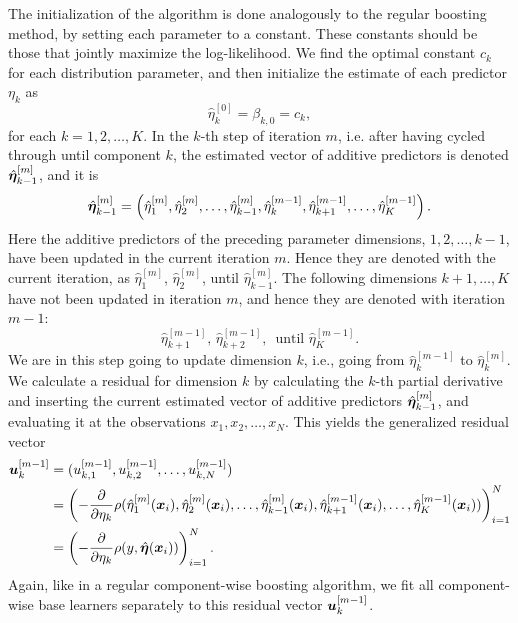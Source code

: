 The initialization of the algorithm is done analogously to the regular boosting method, by setting each parameter to a constant.
These constants should be those that jointly maximize the log-likelihood.
We find the optimal constant $c_k$ for each distribution parameter, and then initialize the estimate of each predictor $\eta_k$ as
\begin{equation*}
    \hat{\eta}_k^{[0]}=\beta_{k,0}=c_k,
\end{equation*}
for each $k=1,2,\ldots,K$.
In the $k$-th step of iteration $m$, i.e. after having cycled through until component $k$, the estimated vector of additive predictors is denoted $\hat{\boldsymbol{\eta}}_{k-1}^{[m]}$, and it is
\begin{equation*}
    \hat{\boldsymbol{\eta}}_{k-1}^{[m]}=\left(\hat{\eta}_1^{[m]},\hat{\eta}_2^{[m]},\ldots,\hat{\eta}_{k-1}^{[m]},\hat{\eta}_{k}^{[m-1]},\hat{\eta}_{k+1}^{[m-1]},\ldots,\hat{\eta}_{K}^{[m-1]}\right).
\end{equation*}
Here the additive predictors of the preceding parameter dimensions, $1,2,\ldots,k-1$, have been updated in the current iteration $m$.
Hence they are denoted with the current iteration, as $\hat{\eta}_1^{[m]}$, $\hat{\eta}_2^{[m]}$, until $\hat{\eta}_{k-1}^{[m]}$.
The following dimensions $k+1,\ldots,K$ have not been updated in iteration $m$, and hence they are denoted with iteration $m-1$:
\begin{equation*}
    \hat{\eta}_{k+1}^{[m-1]},\, \hat{\eta}_{k+2}^{[m-1]},\,\text{ until }\hat{\eta}_{K}^{[m-1]}.
\end{equation*}
We are in this step going to update dimension $k$, i.e., going from $\hat{\eta}_{k}^{[m-1]}$ to $\hat{\eta}_{k}^{[m]}$.
We calculate a residual for dimension $k$ by calculating the $k$-th partial derivative and inserting the current estimated vector of additive predictors $\hat{\boldsymbol{\eta}}_{k-1}^{[m]}$, and evaluating it at the observations $x_1,x_2,\ldots,x_N$.
This yields the generalized residual vector
\begin{align*}
    \bm{u}_k^{[m-1]}&=(u_{k,1}^{[m-1]},u_{k,2}^{[m-1]},\ldots,u_{k,N}^{[m-1]})\\
    &=\left(-\frac{\partial}{\partial \eta_k}\rho(\hat{\eta}_1^{[m]}(\bm{x}_i),\hat{\eta}_2^{[m]}(\bm{x}_i),\ldots,\hat{\eta}_{k-1}^{[m]}(\bm{x}_i),\hat{\eta}_{k+1}^{[m-1]}(\bm{x}_i),\ldots,\hat{\eta}_{K}^{[m-1]}(\bm{x}_i))\right)_{i=1}^N \\
    &=\left(-\frac{\partial}{\partial \eta_k}\rho(y,\hat{\boldsymbol{\eta}}(\bm{x}_i))\right)_{i=1}^N.
\end{align*}
Again, like in a regular component-wise boosting algorithm, we fit all component-wise base learners separately to this residual vector $\bm{u}_k^{[m-1]}$.

